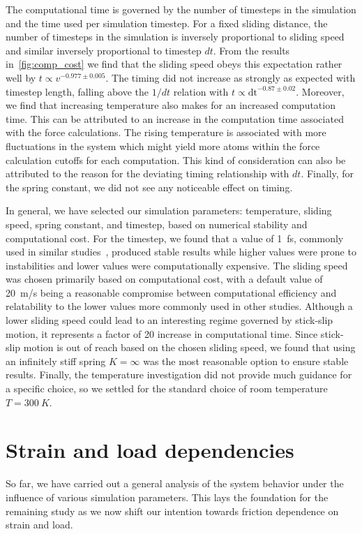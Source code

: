 The computational time is governed by the number of timesteps in the simulation
and the time used per simulation timestep. For a fixed sliding distance, the number of timesteps in the simulation is inversely proportional
to sliding speed and similar inversely proportional to timestep $dt$. From the
results in~\cref{fig:comp_cost} we find that the sliding speed obeys this
expectation rather well by $t \propto v^{-0.977 \pm 0.005}$. The timing did not increase as strongly as expected with timestep length, falling above the $1/dt$ relation with $t
\propto \text{dt}^{-0.87\pm 0.02}$. Moreover, we find that increasing
temperature also makes for an increased computation time. This can be attributed
to an increase in the computation time associated with the force calculations. The
rising temperature is associated with more fluctuations in the system which might
yield more atoms within the force calculation cutoffs for each computation. This kind of consideration can also be attributed to the reason for the deviating timing relationship with $dt$. Finally, for the spring constant, we did not see any noticeable effect on timing.


In general, we have selected our simulation parameters: temperature, sliding speed, spring constant, and timestep, based on numerical stability
and computational cost. For the timestep, we found that a value of \SI{1}{fs},
commonly used in similar studies~\cite{liu_high-speed_2014, zhu_study_2018},
produced stable results while higher values were prone to instabilities and
lower values were computationally expensive. The sliding speed was chosen primarily based on computational cost, with a default value of \SI{20}{m/s} being a reasonable compromise between computational efficiency and relatability to the lower values more commonly used in other studies. Although a lower sliding speed could lead to an interesting regime governed by stick-slip motion, it represents a factor of 20 increase in computational time. Since stick-slip motion is out of reach based on the chosen sliding speed, we found that using an infinitely stiff spring $K = \infty$ was the most reasonable option to ensure stable results. Finally, the temperature investigation did not provide much guidance for a specific choice, so we settled for the standard choice of room temperature $T = \SI{300}{K}$.



\section{Strain and load dependencies}\label{sec:load_and_stretch}
So far, we have carried out a general analysis of the system behavior under the influence of various simulation parameters. This lays the foundation for the remaining study as we now shift our intention towards friction dependence on strain and load.

